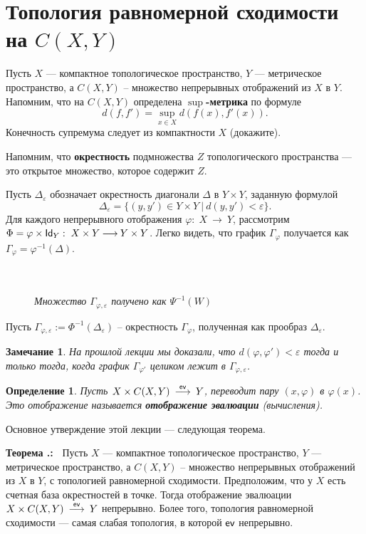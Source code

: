 \documentclass[12pt]{book}
\newcommand{\arrow}{{\:\longrightarrow\:}}
\renewcommand{\phi}{\varphi}
\renewcommand{\epsilon}{\varepsilon}
\def\Id{{\operatorname{\sf Id}}}
\newcommand{\ev}{\operatorname{\sf ev}}
\theoremstyle{upshape}
\newtheorem{zadacha}{Задача}[chapter]
\theoremstyle{generic}
\newtheorem{opredelenie}[teorema]{Определение}
\newtheorem{remark}[teorema]{Замечание}
\def\замечание{\begin{remark}}
\def\еза{\end{remark}}
\theoremstyle{upshapenonumber}
\newcommand{\следствие}{%
     \refstepcounter{teorema}
     {\noindent\bf Следствие \thechapter.\arabic{teorema}:\ }}
\newcommand{\пример}{%
     \refstepcounter{teorema}
     {\noindent\bf Пример \thechapter.\arabic{teorema}:\ }}
\newcommand{\лемма}{%
     \refstepcounter{teorema}
     {\noindent\bf Лемма \thechapter.\arabic{teorema}:\ }}
\newcommand{\теорема}{%
     \refstepcounter{teorema}
     {\noindent\bf Теорема \thechapter.\arabic{teorema}:\ }}
\newcommand{\утверждение}{%
     \refstepcounter{teorema}
     {\noindent\bf Утверждение \thechapter.\arabic{teorema}:\ }}
\def\хфилл{\hfill}
\def\бф{\bf}
\def\ем{\em}
\def\задача{\begin{zadacha}}
\def\ез{\end{zadacha}}
\def\еу{\end{ukazanie}}
\def\определение{\begin{opredelenie}}
\def\ео{\end{opredelenie}}
\def\енум{\begin{enumerate}}
\def\ее{\end{enumerate}}
\begin{document}
\section{Топология равномерной сходимости на $C(X,Y)$}



Пусть $X$ --- компактное топологическое пространство,
$Y$ --- метрическое пространство, а $C(X,Y)$ --
множество непрерывных отображений из $X$ в $Y$.
Напомним, что на $C(X,Y)$ определена {\бф $\sup$-метрика}
по формуле
\[
d(f, f') = \sup_{x\in X}d(f(x), f'(x)).
\]
Конечность супремума следует из компактности $X$
(докажите).

Напомним, что {\бф окрестность} подмножества
$Z$ топологического пространства --- это открытое
множество, которое содержит $Z$.

Пусть $\Delta_\epsilon$ обозначает 
окрестность диагонали $\Delta$ в $Y\times Y$, заданную формулой
\[
\Delta_\epsilon = \{ (y,y') \in Y \times Y \ | \  d(y, y')
< \epsilon \}.
\]
Для каждого непрерывного отображения 
$\phi:\; X \arrow Y$, рассмотрим 
$\Phi= \phi \times \Id_Y:\; X \times Y \arrow Y \times Y$.
Легко видеть, что график $\Gamma_\phi$ получается как
$\Gamma_\phi = \phi^{-1}(\Delta)$.


\begin{figure}[ht]
\begin{center}\ \\
\\
{\small \em Множество $\Gamma_{\phi, \epsilon}$ получено как $\Psi^{-1}(W)$}
\end{center}
\end{figure}
Пусть $\Gamma_{\phi, \epsilon}:=\Phi^{-1}(\Delta_\epsilon)$ --
окрестность $\Gamma_\phi$, полученная как прообраз $\Delta_\epsilon$.

\замечание\label{_Gamma_f_epsilon_neigh_Zamechanie_}
На прошлой лекции мы доказали, что
$d(\phi, \phi') < \epsilon$ тогда и только тогда,
когда график $\Gamma_{\phi'}$ целиком лежит в 
$\Gamma_{\phi, \epsilon}$.
\еза

\определение
Пусть
$X \times C(X,Y) \stackrel{\ev}\arrow Y$,
переводит пару $(x, \phi)$ в $\phi(x)$.
Это отображение называется
{\бф отображение эвалюации} (вычисления).
\ео

Основное утверждение этой лекции --- следующая теорема.

\хфилл

\теорема\label{_eval_C(X,Y)_Teorema_}
Пусть $X$ --- компактное топологическое пространство,
$Y$ --- метрическое пространство, а $C(X,Y)$ --
множество непрерывных отображений из $X$ в $Y$,
с топологией равномерной сходимости.
Предположим, что у $X$ есть счетная база окрестностей в точке.
Тогда отображение эвалюации 
$X \times C(X,Y) \stackrel{\ev}\arrow Y$
непрерывно. Более того, топология равномерной
сходимости --- самая слабая топология, в
которой $\ev$ непрерывно.
\end{document}
